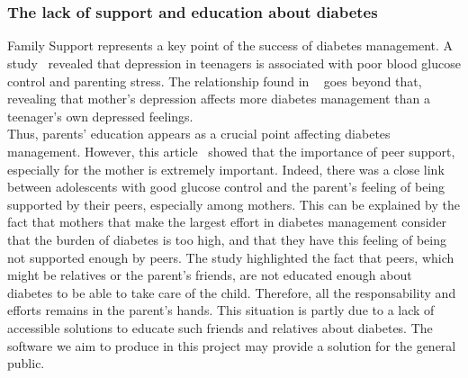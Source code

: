 


\\
\\

\subsubsection{The lack of support and education about diabetes}
Family Support represents a key point of the success of diabetes management. A study~\cite{maas2013interrelationships} revealed that depression in teenagers is associated with poor blood glucose control and parenting stress. The relationship found in ~\cite{clayton2013impact}  goes beyond that, revealing that mother's depression affects more diabetes management than a teenager's own depressed feelings.
\\Thus, parents' education appears as a crucial point affecting diabetes management. However, 
this article~\cite{familyFactors} showed that the importance of peer support, especially for the mother is extremely important. Indeed, there was a close link between adolescents with good glucose control and the parent's feeling of being supported by their peers, especially among mothers. This can be explained by the fact that mothers that make the largest effort in diabetes management consider that the burden of diabetes is too high, and that they have this feeling of being not supported enough by peers. The study highlighted the fact that peers, which might be relatives or the parent's friends, are not educated enough about diabetes to be able to take care of the child. Therefore, all the responsability and efforts remains in the parent's hands. This situation is partly due to a lack of accessible solutions to educate such friends and relatives about diabetes. The software we aim to produce in this project may provide a solution for the general public.\\
            

